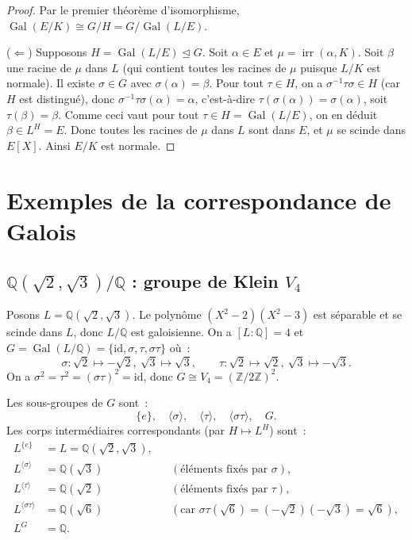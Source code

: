 \documentclass[12pt,a4paper,openany]{book}
\theoremstyle{definition}
\newcommand{\Z}{\mathbb{Z}}
\newcommand{\Q}{\mathbb{Q}}
\newcommand{\Gal}{\operatorname{Gal}}
\newcommand{\irr}{\operatorname{irr}}
\begin{document}
\begin{proof}
Par le premier théorème d'isomorphisme,
$\Gal(E/K) \cong G/H = G/\Gal(L/E)$.

($\Leftarrow$) Supposons $H = \Gal(L/E) \trianglelefteq G$. Soit
$\alpha \in E$ et $\mu = \irr(\alpha, K)$. Soit $\beta$ une racine de $\mu$
dans $L$ (qui contient toutes les racines de $\mu$ puisque $L/K$ est
normale). Il existe $\sigma \in G$ avec $\sigma(\alpha) = \beta$. Pour tout
$\tau \in H$, on a $\sigma^{-1}\tau\sigma \in H$ (car $H$ est distingué),
donc $\sigma^{-1}\tau\sigma(\alpha) = \alpha$, c'est-à-dire
$\tau(\sigma(\alpha)) = \sigma(\alpha)$, soit $\tau(\beta) = \beta$.
Comme ceci vaut pour tout $\tau \in H = \Gal(L/E)$, on en déduit
$\beta \in L^H = E$. Donc toutes les racines de $\mu$ dans $L$ sont dans $E$,
et $\mu$ se scinde dans $E[X]$. Ainsi $E/K$ est normale.
\end{proof}

\section{Exemples de la correspondance de Galois}\label{sec:exemples-correspondance}

\subsection{$\Q(\sqrt{2},\sqrt{3})/\Q$ : groupe de Klein $V_4$}\label{ssec:V4}

Posons $L = \Q(\sqrt{2},\sqrt{3})$. Le polynôme $(X^2-2)(X^2-3)$ est
séparable et se scinde dans $L$, donc $L/\Q$ est galoisienne. On a
$[L:\Q] = 4$ et $G = \Gal(L/\Q) = \{\mathrm{id}, \sigma, \tau, \sigma\tau\}$
où~:
\[
  \sigma \colon \sqrt{2} \mapsto -\sqrt{2},\ \sqrt{3} \mapsto \sqrt{3},
  \qquad
  \tau \colon \sqrt{2} \mapsto \sqrt{2},\ \sqrt{3} \mapsto -\sqrt{3}.
\]
On a $\sigma^2 = \tau^2 = (\sigma\tau)^2 = \mathrm{id}$, donc
$G \cong V_4 = (\Z/2\Z)^2$.

Les sous-groupes de $G$ sont~:
\[
  \{e\},\quad \langle\sigma\rangle,\quad \langle\tau\rangle,\quad
  \langle\sigma\tau\rangle,\quad G.
\]
Les corps intermédiaires correspondants (par $H \mapsto L^H$) sont~:
\begin{align*}
  L^{\{e\}} &= L = \Q(\sqrt{2},\sqrt{3}), \\
  L^{\langle\sigma\rangle} &= \Q(\sqrt{3}) &
    &(\text{éléments fixés par }\sigma), \\
  L^{\langle\tau\rangle} &= \Q(\sqrt{2}) &
    &(\text{éléments fixés par }\tau), \\
  L^{\langle\sigma\tau\rangle} &= \Q(\sqrt{6}) &
    &(\text{car }\sigma\tau(\sqrt{6}) = (-\sqrt{2})(-\sqrt{3}) = \sqrt{6}), \\
  L^G &= \Q.
\end{align*}
\end{document}
